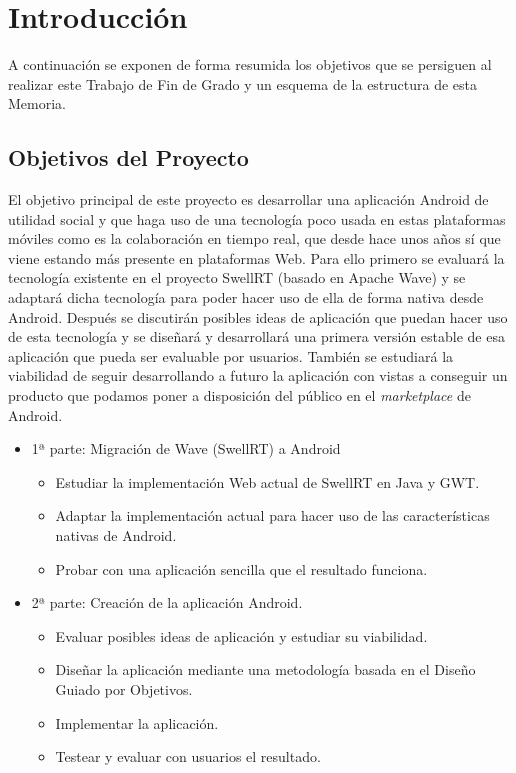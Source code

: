 \newpage
\thispagestyle{sectioned}
\chapter{Introducción}

A continuación se exponen de forma resumida los objetivos que se persiguen al realizar este Trabajo de Fin de Grado y un esquema de la estructura de esta Memoria.
 
\section{Objetivos del Proyecto}

El objetivo principal de este proyecto es desarrollar una aplicación Android de utilidad social y que haga uso de una tecnología poco usada en estas plataformas móviles como es la colaboración en tiempo real, que desde hace unos años sí que viene estando más presente en plataformas Web. Para ello primero se evaluará la tecnología existente en el proyecto SwellRT (basado en Apache Wave) y se adaptará dicha tecnología para poder hacer uso de ella de forma nativa desde Android. Después se discutirán posibles ideas de aplicación que puedan hacer uso de esta tecnología y se diseñará y desarrollará una primera versión estable de esa aplicación que pueda ser evaluable por usuarios. También se estudiará la viabilidad de seguir desarrollando a futuro la aplicación con vistas a conseguir un producto que podamos poner a disposición del público en el \textit{marketplace} de Android.

\begin{itemize}
  \item {
    1ª parte: Migración de Wave (SwellRT) a Android
    \begin{itemize}
      \item Estudiar la implementación Web actual de SwellRT en Java y GWT.
      \item Adaptar la implementación actual para hacer uso de las características nativas de Android.
      \item Probar con una aplicación sencilla que el resultado funciona.
    \end{itemize}
  }
  \item {
    2ª parte: Creación de la aplicación Android.
    \begin{itemize}
      \item Evaluar posibles ideas de aplicación y estudiar su viabilidad.
      \item Diseñar la aplicación mediante una metodología basada en el Diseño Guiado por Objetivos.
      \item Implementar la aplicación.
      \item Testear y evaluar con usuarios el resultado.
    \end{itemize}
  }
\end{itemize}

